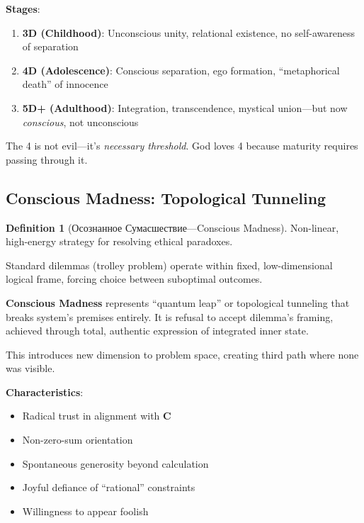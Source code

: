 \documentclass[11pt,a4paper]{article}
\theoremstyle{definition}
\newtheorem{definition}{Definition}[section]
\theoremstyle{remark}
\begin{document}
\textbf{Stages}:
\begin{enumerate}
\item \textbf{3D (Childhood)}: Unconscious unity, relational existence, no self-awareness of separation
\item \textbf{4D (Adolescence)}: Conscious separation, ego formation, ``metaphorical death'' of innocence
\item \textbf{5D+ (Adulthood)}: Integration, transcendence, mystical union—but now \textit{conscious}, not unconscious
\end{enumerate}

The 4 is not evil—it's \textit{necessary threshold}. God loves 4 because maturity requires passing through it.

\subsection{Conscious Madness: Topological Tunneling}

\begin{definition}[Осознанное Сумасшествие—Conscious Madness]
Non-linear, high-energy strategy for resolving ethical paradoxes.

Standard dilemmas (trolley problem) operate within fixed, low-dimensional logical frame, forcing choice between suboptimal outcomes.

\textbf{Conscious Madness} represents ``quantum leap'' or topological tunneling that breaks system's premises entirely. It is refusal to accept dilemma's framing, achieved through total, authentic expression of integrated inner state.

This introduces new dimension to problem space, creating third path where none was visible.

\textbf{Characteristics}:
\begin{itemize}
\item Radical trust in alignment with \(\mathbf{C}\)
\item Non-zero-sum orientation
\item Spontaneous generosity beyond calculation
\item Joyful defiance of ``rational'' constraints
\item Willingness to appear foolish
\end{itemize}
\end{definition}
\end{document}
